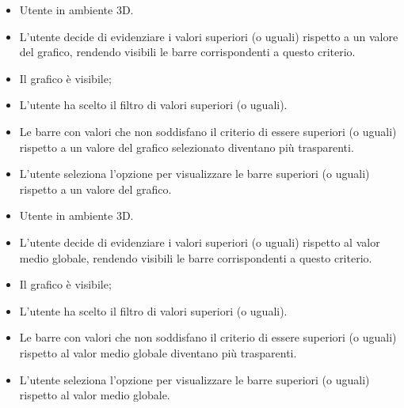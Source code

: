 \UCdsc
{ %
    \begin{itemize}
        \item Utente in ambiente 3D.
    \end{itemize}
}
{ %
    \begin{itemize}
        \item L'utente decide di evidenziare i valori superiori (o uguali) rispetto a un valore del grafico, rendendo visibili le barre corrispondenti a questo criterio.
    \end{itemize}
}
{ %
    \begin{itemize}
        \item Il grafico è visibile;
        \item L'utente ha scelto il filtro di valori superiori (o uguali).
    \end{itemize}
}
{ %
    \begin{itemize}
        \item Le barre con valori che non soddisfano il criterio di essere superiori (o uguali) rispetto a un valore del grafico selezionato diventano più trasparenti.
    \end{itemize}
}
{ %
    \begin{itemize}
        \item L'utente seleziona l'opzione per visualizzare le barre superiori (o uguali) rispetto a un valore del grafico.
    \end{itemize}
}


\UCdsc
{ %
    \begin{itemize}
        \item Utente in ambiente 3D.
    \end{itemize}
}
{ %
    \begin{itemize}
        \item L'utente decide di evidenziare i valori superiori (o uguali) rispetto al valor medio globale, rendendo visibili le barre corrispondenti a questo criterio.
    \end{itemize}
}
{ %
    \begin{itemize}
        \item Il grafico è visibile;
        \item L'utente ha scelto il filtro di valori superiori (o uguali).
    \end{itemize}
}
{ %
    \begin{itemize}
        \item Le barre con valori che non soddisfano il criterio di essere superiori (o uguali) rispetto al valor medio globale diventano più trasparenti.
    \end{itemize}
}
{ %
    \begin{itemize}
        \item L'utente seleziona l'opzione per visualizzare le barre superiori (o uguali) rispetto al valor medio globale.
    \end{itemize}
}


